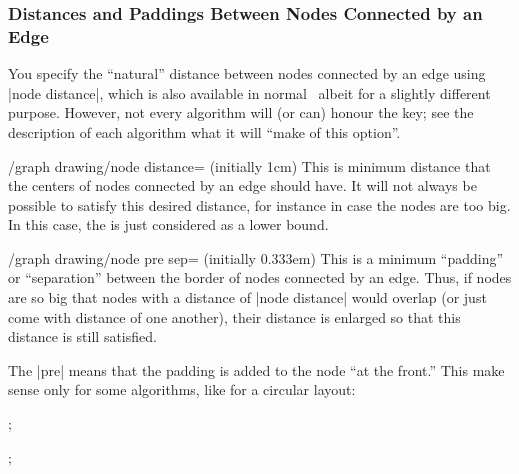 \subsubsection{Distances and Paddings Between Nodes Connected by an Edge}

You specify the ``natural'' distance between nodes
connected by an edge using |node distance|, which is also available in
normal \tikzname\ albeit for a slightly different purpose. However,
not every algorithm will (or can) honour the key; see the description
of each algorithm what it will ``make of this option''.

\begin{key}{/graph drawing/node distance= (initially 1cm)}
  This is minimum distance that the centers of nodes connected by an
  edge should have. It will not always be possible to satisfy this
  desired distance, for instance in case the nodes are too big. In
  this case, the  is just considered as a lower bound.
\begin{codeexample}[]
\end{codeexample}
\end{key}


\begin{key}{/graph drawing/node pre sep= (initially 0.333em)}
  This is a minimum ``padding'' or ``separation'' between the border
  of nodes connected by an edge. Thus, if nodes are so big that nodes
  with a distance of |node distance| would overlap (or
  just come with  distance of one another), their
  distance is enlarged so that this distance is still satisfied.

  The |pre| means that the padding is added to the node ``at the
  front.'' This make sense only for some algorithms, like for a
  circular layout:
  
\begin{codeexample}[]
\tikz {};
\end{codeexample}
\begin{codeexample}[]
\tikz {};  
\end{codeexample}
\end{key}

